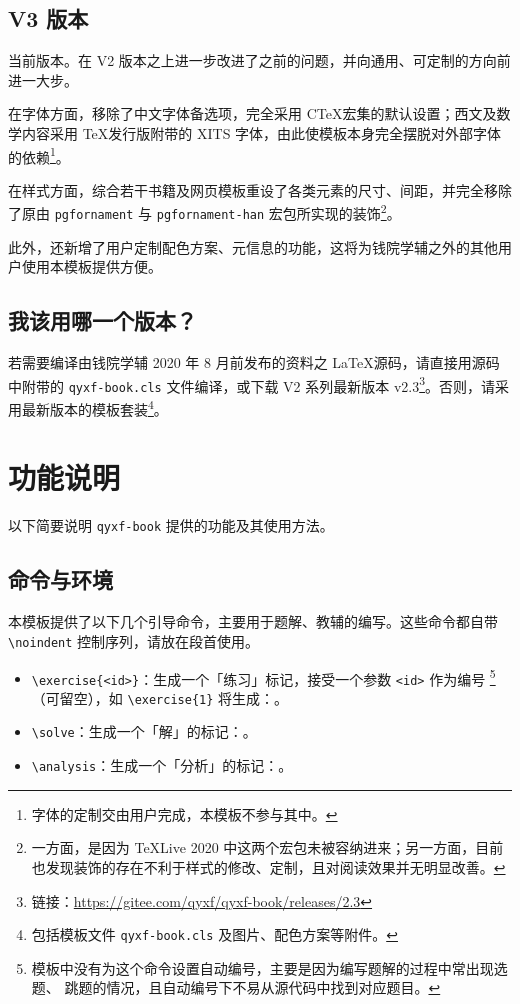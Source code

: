 \documentclass[
  10pt,
  twoside,
  openany,
  b5paper, %
  colorscheme = basic %
]{qyxf-book}
\begin{document}
\subsection{V3 版本}

当前版本。在 V2 版本之上进一步改进了之前的问题，并向通用、可定制的方向前进一大步。

在字体方面，移除了中文字体备选项，完全采用 C\TeX 宏集的默认设置；西文及数学内容采用 \TeX 发行版附带的 XITS 字体，由此使模板本身完全摆脱对外部字体的依赖\footnote{字体的定制交由用户完成，本模板不参与其中。}。

在样式方面，综合若干书籍及网页模板重设了各类元素的尺寸、间距，并完全移除了原由 \verb|pgfornament| 与 \verb|pgfornament-han| 宏包所实现的装饰\footnote{一方面，是因为 \TeX Live 2020 中这两个宏包未被容纳进来；另一方面，目前也发现装饰的存在不利于样式的修改、定制，且对阅读效果并无明显改善。}。

此外，还新增了用户定制配色方案、元信息的功能，这将为钱院学辅之外的其他用户使用本模板提供方便。

\subsection{我该用哪一个版本？}

若需要编译由钱院学辅 2020 年 8 月前发布的资料之 \LaTeX 源码，请直接用源码中附带的 \verb|qyxf-book.cls| 文件编译，或下载 V2 系列最新版本 v2.3\footnote{链接：\url{https://gitee.com/qyxf/qyxf-book/releases/2.3}}。否则，请采用最新版本的模板套装\footnote{包括模板文件 \texttt{qyxf-book.cls} 及图片、配色方案等附件。}。

\section{功能说明}

以下简要说明 \verb|qyxf-book| 提供的功能及其使用方法。

\subsection{命令与环境}

本模板提供了以下几个引导命令，主要用于题解、教辅的编写。这些命令都自带 \verb|\noindent| 控制序列，请放在段首使用。

\begin{itemize}
  \item \verb|\exercise{<id>}|：生成一个「练习」标记，接受一个参数 \verb|<id>| 作为编号
        \footnote{模板中没有为这个命令设置自动编号，主要是因为编写题解的过程中常出现选题、
        跳题的情况，且自动编号下不易从源代码中找到对应题目。}
        （可留空），如 \verb|\exercise{1}| 将生成：。
  \item \verb|\solve|：生成一个「解」的标记：\solve。
  \item \verb|\analysis|：生成一个「分析」的标记：\analysis。
\end{itemize}
\end{document}
